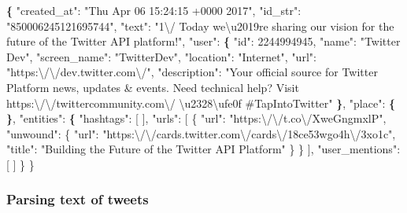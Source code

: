 \documentclass[
]{article}
\newenvironment{Shaded}{\begin{snugshade}}{\end{snugshade}}
\newcommand{\BuiltInTok}[1]{#1}
\newcommand{\ExtensionTok}[1]{#1}
\newcommand{\KeywordTok}[1]{\textcolor[rgb]{0.13,0.29,0.53}{\textbf{#1}}}
\newcommand{\NormalTok}[1]{#1}
\newcommand{\StringTok}[1]{\textcolor[rgb]{0.31,0.60,0.02}{#1}}
\begin{document}
\begin{Shaded}
\begin{Highlighting}[]
\KeywordTok{\{}
  \StringTok{"created_at"}\NormalTok{: }\StringTok{"Thu Apr 06 15:24:15 +0000 2017"}\NormalTok{,}
  \StringTok{"id_str"}\NormalTok{: }\StringTok{"850006245121695744"}\NormalTok{,}
  \StringTok{"text"}\NormalTok{: }\StringTok{"1\textbackslash{}/ Today we\textbackslash{}u2019re sharing our vision for the future of the Twitter API platform!"}\NormalTok{,}
  \StringTok{"user"}\NormalTok{: }\KeywordTok{\{}
    \StringTok{"id"}\NormalTok{: }\ExtensionTok{2244994945}\NormalTok{,}
    \StringTok{"name"}\NormalTok{: }\StringTok{"Twitter Dev"}\NormalTok{,}
    \StringTok{"screen_name"}\NormalTok{: }\StringTok{"TwitterDev"}\NormalTok{,}
    \StringTok{"location"}\NormalTok{: }\StringTok{"Internet"}\NormalTok{,}
    \StringTok{"url"}\NormalTok{: }\StringTok{"https:\textbackslash{}/\textbackslash{}/dev.twitter.com\textbackslash{}/"}\NormalTok{,}
    \StringTok{"description"}\NormalTok{: }\StringTok{"Your official source for Twitter Platform news, updates & events. }
\StringTok{    Need technical help? Visit https:\textbackslash{}/\textbackslash{}/twittercommunity.com\textbackslash{}/ \textbackslash{}u2328\textbackslash{}ufe0f }
\StringTok{    #TapIntoTwitter"}
  \KeywordTok{\}}\NormalTok{,}
  \StringTok{"place"}\NormalTok{: }\KeywordTok{\{}   
  \KeywordTok{\}}\NormalTok{,}
  \StringTok{"entities"}\NormalTok{: }\KeywordTok{\{}
    \StringTok{"hashtags"}\NormalTok{:}\BuiltInTok{ [}      
\NormalTok{    ],}
    \StringTok{"urls"}\NormalTok{: [}
\NormalTok{      \{}
        \StringTok{"url"}\NormalTok{: }\StringTok{"https:\textbackslash{}/\textbackslash{}/t.co\textbackslash{}/XweGngmxlP"}\NormalTok{,}
        \StringTok{"unwound"}\NormalTok{: \{}
          \StringTok{"url"}\NormalTok{: }\StringTok{"https:\textbackslash{}/\textbackslash{}/cards.twitter.com\textbackslash{}/cards\textbackslash{}/18ce53wgo4h\textbackslash{}/3xo1c"}\NormalTok{,}
          \StringTok{"title"}\NormalTok{: }\StringTok{"Building the Future of the Twitter API Platform"}
\NormalTok{        \}}
\NormalTok{      \}}
\NormalTok{    ],}
    \StringTok{"user_mentions"}\NormalTok{: [     }
\NormalTok{    ]}
\NormalTok{  \}}
\NormalTok{\}}
\end{Highlighting}
\end{Shaded}

\hypertarget{parsing-text-of-tweets}{%
\subsubsection{Parsing text of tweets}\label{parsing-text-of-tweets}}
\end{document}
